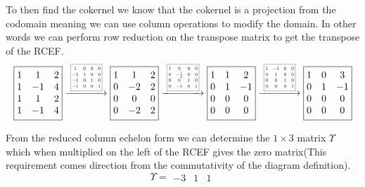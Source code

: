 \documentclass[12pt]{amsart}
\theoremstyle{definition}
\newcommand{\R}{\mathbb{R}}
\DeclareMathOperator{\coker}{\mathrm{coker}}
\newcommand{\ra}{\rightarrow}
\begin{document}
\begin{enumerate}
To then find the cokernel we know that the cokernel is a projection from the codomain meaning we can use column operations to modify the domain. In other words we can perform row reduction on the transpose matrix to get the transpose of the RCEF.
$$\boxed{\begin{matrix}
1 & 1 & 2\\
1 & -1 & 4\\
1 & 1 & 2\\
1 & -1 & 4
\end{matrix}}\xrightarrow{\scalebox{0.5}{\;
\boxed{\begin{matrix}
    1 &0& 0&0\\
    -1& 1 & 0&0\\
    -1 & 0 & 1&0\\
    -1&0&0&1
\end{matrix}}\;}}
\boxed{\begin{matrix}
1 & 1 & 2\\
0 & -2 & 2\\
0 & 0 & 0\\
0 & -2 & 2
\end{matrix}}
\xrightarrow{\scalebox{0.5}{\;
\boxed{\begin{matrix}
    1 & 0 & 0 & 0\\
    0 & -\frac{1}{2} & 0 & 0\\
    0 & 0 & 1 & 0\\
    0 & -1 & 0 & 1
\end{matrix}}\;}}
\boxed{\begin{matrix}
1 & 1 & 2\\
0 & 1 & -1\\
0 & 0 & 0\\
0 & 0 & 0
\end{matrix}}
\xrightarrow{\scalebox{0.5}{\;
\boxed{\begin{matrix}
    1 & -1 & 0 & 0\\
    0 & 1 & 0 & 0\\
    0 & 0 & 1 & 0\\
    0 & 0 & 0 & 1
\end{matrix}}\;}}
\boxed{\begin{matrix}
1 & 0 & 3\\
0 & 1 & -1\\
0 & 0 & 0\\
0 & 0 & 0
\end{matrix}}$$

From the reduced column echelon form we can determine the $1\times 3$ matrix $\Upsilon$ which when multiplied on the left of the RCEF gives the zero matrix(This requirement comes direction from the commutativity of the diagram definition).
$$\Upsilon=\boxed{\begin{matrix}
-3 & 1 & 1
\end{matrix}}$$\\


\end{enumerate}
\end{document}
